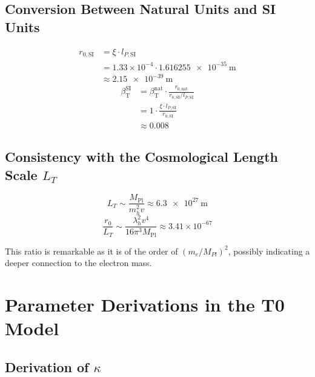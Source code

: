 \documentclass[12pt,a4paper]{article}
\newcommand{\Mpl}{M_{\text{Pl}}}
\newcommand{\betaT}{\beta_{\text{T}}}
\begin{document}
	\subsection{Conversion Between Natural Units and SI Units}
	
	\begin{align}
		r_{0,\text{SI}} &= \xi \cdot l_{P,\text{SI}} \\
		&= 1.33 \times 10^{-4} \cdot \SI{1.616255e-35}{\meter} \\
		&\approx \SI{2.15e-39}{\meter}
	\end{align}
	\begin{align}
		\betaT^{\text{SI}} &= \betaT^{\text{nat}} \cdot \frac{r_{0,\text{nat}}}{r_{0,\text{SI}}/l_{P,\text{SI}}} \\
		&= 1 \cdot \frac{\xi \cdot l_{P,\text{SI}}}{r_{0,\text{SI}}} \\
		&\approx 0.008
	\end{align}
	
	\subsection{Consistency with the Cosmological Length Scale \(L_T\)}
	
	\begin{equation}
		L_T \sim \frac{\Mpl}{m_h^2 v} \approx \SI{6.3e27}{\meter}
	\end{equation}
	\begin{equation}
		\frac{r_0}{L_T} \sim \frac{\lambda_h^2 v^4}{16\pi^3 \Mpl} \approx 3.41 \times 10^{-67}
	\end{equation}
	
	This ratio is remarkable as it is of the order of \((m_e/M_{Pl})^2\), possibly indicating a deeper connection to the electron mass.
	
	\section{Parameter Derivations in the T0 Model}
	
	\subsection{Derivation of \(\kappa\)}
	
\end{document}
